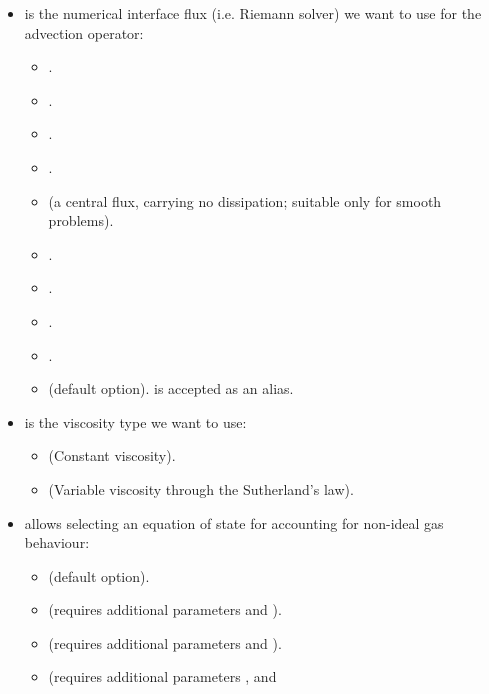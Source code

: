 \begin{itemize}
\begin{itemize}
      \item {} (Symmetric interior penalty method).
    \end{itemize}
    Note that only  and  are fully supported, the other operators work only
    with quadrilateral elements ($2D$ or $2.5D$).
  \item {} is the numerical interface flux (i.e. Riemann solver)
    we want to use for the advection operator:
    \begin{itemize}
      \item {}.
      \item {}.
      \item {}.
      \item {}.
      \item {} (a central flux, carrying no dissipation; suitable
        only for smooth problems).
      \item {}.
      \item {}.
      \item {}.
      \item {}.
      \item {} (default option).  is accepted as an
        alias.
    \end{itemize}
  \item {} is the viscosity type we want to use:
    \begin{itemize}
      \item {} (Constant viscosity).
      \item {} (Variable viscosity through the Sutherland's law).
    \end{itemize}
  \item {} allows selecting an equation of state for
    accounting for non-ideal gas behaviour:
    \begin{itemize}
        \item {} (default option).
        \item {} (requires additional parameters  and ).
        \item {} (requires additional parameters  and ).
        \item {} (requires additional parameters ,  and

\end{itemize}
\end{itemize}
